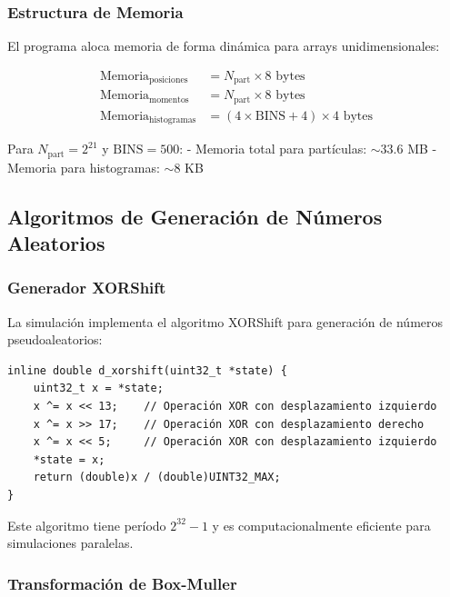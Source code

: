 \documentclass[12pt,a4paper]{article}
\begin{document}
\subsubsection{Estructura de Memoria}

El programa aloca memoria de forma dinámica para arrays unidimensionales:

\begin{equation}
\begin{aligned}
\text{Memoria}_{\text{posiciones}} &= N_{\text{part}} \times 8 \text{ bytes} \\
\text{Memoria}_{\text{momentos}} &= N_{\text{part}} \times 8 \text{ bytes} \\
\text{Memoria}_{\text{histogramas}} &= (4 \times \text{BINS} + 4) \times 4 \text{ bytes}
\end{aligned}
\end{equation}

Para $N_{\text{part}} = 2^{21}$ y $\text{BINS} = 500$:
- Memoria total para partículas: $\sim 33.6$ MB
- Memoria para histogramas: $\sim 8$ KB

\subsection{Algoritmos de Generación de Números Aleatorios}

\subsubsection{Generador XORShift}

La simulación implementa el algoritmo XORShift para generación de números pseudoaleatorios:

\begin{lstlisting}[caption=Implementación XORShift]
inline double d_xorshift(uint32_t *state) {
    uint32_t x = *state;
    x ^= x << 13;    // Operación XOR con desplazamiento izquierdo
    x ^= x >> 17;    // Operación XOR con desplazamiento derecho
    x ^= x << 5;     // Operación XOR con desplazamiento izquierdo
    *state = x;
    return (double)x / (double)UINT32_MAX;
}
\end{lstlisting}

Este algoritmo tiene período $2^{32} - 1$ y es computacionalmente eficiente para simulaciones paralelas.

\subsubsection{Transformación de Box-Muller}
\end{document}

